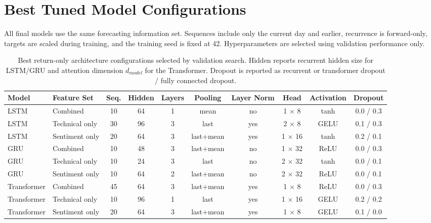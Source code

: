 \documentclass[10pt,twocolumn]{article}
\begin{document}
\section{Best Tuned Model Configurations}

All final models use the same forecasting information set. Sequences include only the current day and earlier, recurrence is forward-only, targets are scaled during training, and the training seed is fixed at 42. Hyperparameters are selected using validation performance only.

\begin{table}[t]
\centering
\scriptsize
\begin{tabular}{llcccccccc}
\toprule
Model & Feature Set & Seq. & Hidden & Layers & Pooling & Layer Norm & Head & Activation & Dropout \\
\midrule
LSTM & Combined & 10 & 64 & 1 & mean & no & 1 $\times$ 8 & tanh & 0.0 / 0.3 \\
LSTM & Technical only & 30 & 96 & 3 & last & yes & 2 $\times$ 8 & GELU & 0.1 / 0.3 \\
LSTM & Sentiment only & 20 & 64 & 3 & last+mean & yes & 1 $\times$ 16 & tanh & 0.2 / 0.1 \\
GRU & Combined & 10 & 48 & 3 & last+mean & no & 1 $\times$ 32 & ReLU & 0.0 / 0.3 \\
GRU & Technical only & 10 & 24 & 3 & last & no & 2 $\times$ 32 & tanh & 0.0 / 0.1 \\
GRU & Sentiment only & 10 & 64 & 2 & last+mean & no & 2 $\times$ 32 & ReLU & 0.0 / 0.1 \\
Transformer & Combined & 45 & 64 & 3 & last+mean & yes & 1 $\times$ 8 & ReLU & 0.0 / 0.3 \\
Transformer & Technical only & 10 & 96 & 1 & last & yes & 1 $\times$ 16 & GELU & 0.2 / 0.2 \\
Transformer & Sentiment only & 20 & 64 & 3 & last+mean & yes & 1 $\times$ 8 & GELU & 0.1 / 0.0 \\
\bottomrule
\end{tabular}
\caption{Best return-only architecture configurations selected by validation search. Hidden reports recurrent hidden size for LSTM/GRU and attention dimension $d_{model}$ for the Transformer. Dropout is reported as recurrent or transformer dropout / fully connected dropout.}
\end{table}
\end{document}
